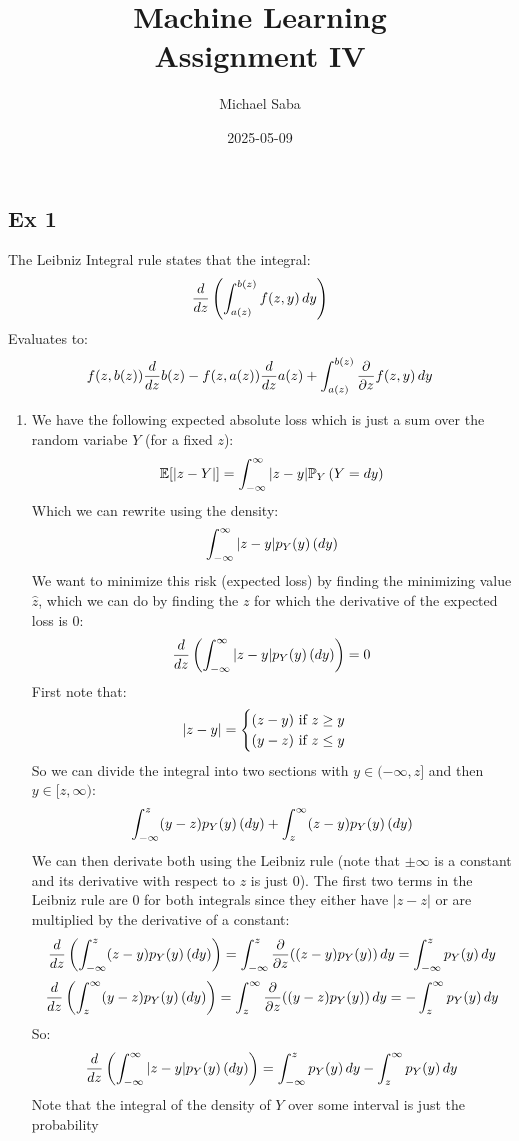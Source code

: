 \documentclass[12pt]{article}
\title{
    \Huge Machine Learning \\
    \Large Assignment IV
}
\date{2025-05-09}
\author{Michael Saba}
\begin{document}
\maketitle
\newpage
\setlength{\parindent}{0pt}

\subsection*{Ex 1}

The Leibniz Integral rule states that
the integral:
\[ \dfrac{d}{dz}
\left( \int_{a(z)}^{b(z)} f(z, y) \, dy \right) \]
Evaluates to:
\[ f(z, b(z))\dfrac{d}{dz}b(z) 
- f(z, a(z))\dfrac{d}{dz}a(z)
+ \int_{a(z)}^{b(z)} \dfrac{\partial }{\partial z}
f(z, y) \, dy \]

\begin{enumerate}[label = \letters]
\item 
We have the following expected absolute loss
which is just a sum over the random variabe
$Y$ (for a fixed $z$):
\[ \mathbb{E}[|z - Y|] 
= \int_{-\infty}^{\infty} |z - y|\mathbb{P}_Y \, (Y = dy) \]
Which we can rewrite using the density:
\[ \int_{-\infty}^{\infty} |z - y|p_Y(y) \, (dy) \]
We want to minimize this risk (expected loss)
by finding the minimizing value $\hat{z}$,
which we can do by finding the $z$
for which the derivative of the expected loss
is $0$:
\[ \dfrac{d}{dz}\left( \int_{-\infty}^{\infty} |z - y|p_Y(y) \, (dy)  \right) = 0 \]
First note that:
\[ |z-y| = \begin{cases} (z-y) \text{ if } z \geq y \\
(y-z) \text{ if } z \leq y \end{cases} \]
So we can divide the integral into two sections
with $y \in (-\infty, z]$
and then $y \in [z, \infty)$:
\[ \int_{-\infty}^{z} (y - z)p_Y(y) \, (dy)
+ \int_{z}^{\infty} (z - y)p_Y(y) \, (dy) \]
We can then derivate both using the Leibniz rule
(note that $\pm\infty$ is a constant
and its derivative with respect to $z$ is just 0).
The first two terms in the Leibniz rule
are $0$ for both integrals
since they either have $|z-z|$
or are multiplied by the derivative of a constant:
\[ \dfrac{d}{dz}\left( 
\int_{-\infty}^{z} (z - y)p_Y(y) \, (dy) \right)
= \int_{-\infty}^{z} \dfrac{\partial }{\partial z}
((z - y)p_Y(y)) \, dy
= \int_{-\infty}^{z} p_Y(y) \, dy \]
\[ \dfrac{d}{dz}\left( 
\int_{z}^{\infty} (y - z)p_Y(y) \, (dy) \right)
= \int_{z}^{\infty} \dfrac{\partial }{\partial z}
((y - z)p_Y(y)) \, dy
= -\int_{z}^{\infty} p_Y(y) \, dy \]
So:
\[ \dfrac{d}{dz}\left( \int_{-\infty}^{\infty} |z - y|p_Y(y) \, (dy)  \right) = 
\int_{-\infty}^{z} p_Y(y) \, dy
-\int_{z}^{\infty} p_Y(y) \, dy\]
Note that the integral of the density of $Y$
over some interval is just the probability

\end{enumerate}
\end{document}
